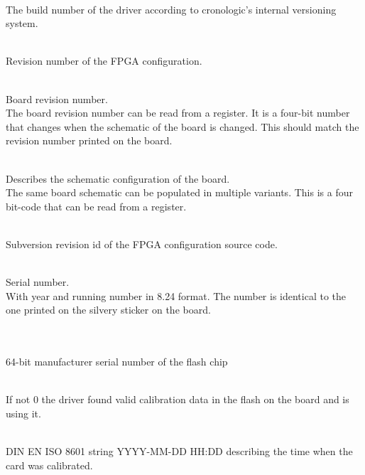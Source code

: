 \\
The build number of the driver according to cronologic's internal versioning system.

\\
Revision number of the FPGA configuration.

\\
Board revision number.\\
The board revision number can be read from a register. It is a four-bit number that changes when the schematic of the board is changed. This should match the revision number printed on the board.

\\
Describes the schematic configuration of the board.\\
The same board schematic can be populated in multiple variants. This is a four bit-code that can be read from a register.

\\
Subversion revision id of the FPGA configuration source code.

\par

\\
Serial number.\\
With year and running number in 8.24 format. The number is identical to the one printed on the silvery sticker on the board.\par

\\
\\
64-bit manufacturer serial number of the flash chip

\\
If not 0 the driver found valid calibration data in the flash on the board and is using it.\par

\\
DIN EN ISO 8601 string YYYY-MM-DD HH:DD describing the time when the card was calibrated.

